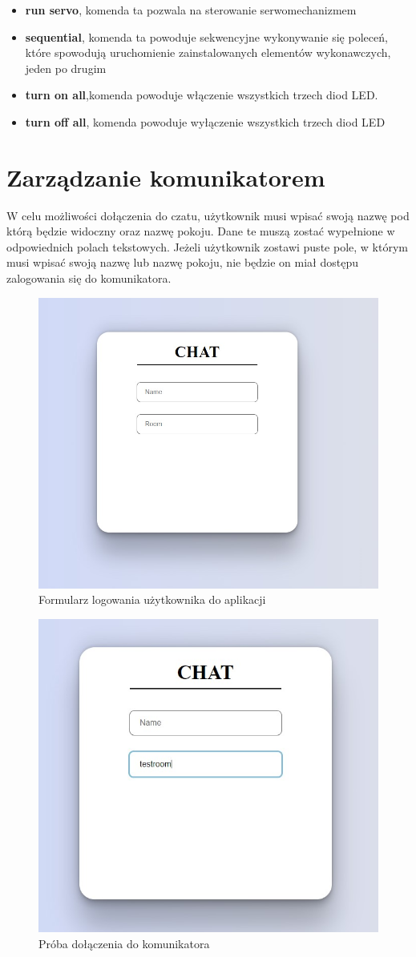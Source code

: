 \begin{itemize}
	\\
	\item \textbf{run servo}, komenda ta pozwala na sterowanie serwomechanizmem
	\\
\item \textbf{sequential}, komenda ta powoduje sekwencyjne wykonywanie się poleceń, które spowodują uruchomienie zainstalowanych elementów wykonawczych, jeden po drugim
	\\
	\item \textbf{turn on all},komenda powoduje włączenie wszystkich trzech diod LED.
	\\
\item \textbf{turn off all}, komenda powoduje wyłączenie wszystkich trzech diod LED
	\\
\end{itemize}
\newpage
\section{Zarządzanie komunikatorem}
W celu możliwości dołączenia do czatu, użytkownik musi wpisać swoją nazwę pod którą będzie widoczny oraz nazwę pokoju. Dane te muszą zostać wypełnione w odpowiednich polach tekstowych. Jeżeli użytkownik zostawi puste pole, w którym musi wpisać swoją nazwę lub nazwę pokoju, nie będzie on miał dostępu zalogowania się do komunikatora.
\begin{figure}[htbp]
	\centering
	\includegraphics[width=0.5\linewidth]{"obrazy/TESTLOGOWANIE"}
	\caption{Formularz logowania użytkownika do aplikacji}
	\label{fig:39}
\end{figure}
\begin{figure}[htbp]
	\centering
	\includegraphics[width=0.5\linewidth]{"obrazy/TESTnazwapokoju"}
	\caption{Próba dołączenia do komunikatora}
	\label{fig:40}
\end{figure}
